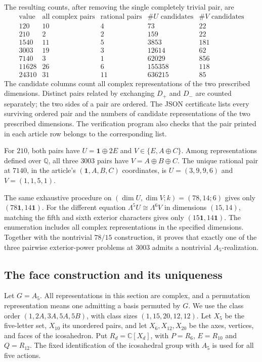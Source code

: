 \documentclass[11pt,a4paper]{article}
\begin{document}
The resulting counts, after removing the single completely trivial pair, are
\[
\begin{array}{r|rr|rr}
\text{value}&\text{all complex pairs}&\text{rational pairs}&\#U\text{ candidates}&\#V\text{ candidates}\\\hline
120&10&4&73&22\\
210&2&2&159&22\\
1540&11&5&3853&181\\
3003&19&3&12614&62\\
7140&3&1&62029&856\\
11628&26&6&155358&118\\
24310&31&11&636215&85
\end{array}
\]
The candidate columns count all complex representations of the two prescribed dimensions. Distinct pairs related by exchanging $D_+$ and $D_-$ are counted separately; the two sides of a pair are ordered. The JSON certificate lists every surviving ordered pair and the numbers of candidate representations of the two prescribed dimensions. The verification program also checks that the pair printed in each article row belongs to the corresponding list.

For $210$, both pairs have $U=\mathbf1\oplus2E$ and $V\in\{E,A\oplus C\}$. Among representations defined over $\mathbb Q$, all three $3003$ pairs have $V=A\oplus B\oplus C$. The unique rational pair at $7140$, in the article's $(\mathbf1,A,B,C)$ coordinates, is $U=(3,9,9,6)$ and $V=(1,1,5,1)$.

The same exhaustive procedure on $(\dim U,\dim V;k)=(78,14;6)$ gives only $(78\mathbf1,14\mathbf1)$. For the different equation $\Lambda^5U\cong\Lambda^6V$ in dimensions $(15,14)$, matching the fifth and sixth exterior characters gives only $(15\mathbf1,14\mathbf1)$. The enumeration includes all complex representations in the specified dimensions. Together with the nontrivial $78/15$ construction, it proves that exactly one of the three pairwise exterior-power problems at $3003$ admits a nontrivial $A_5$-realization.

\subsection{The face construction and its uniqueness}\label{subsec:A5}

Let $G=A_5$. All representations in this section are complex, and a
permutation representation means one admitting a basis permuted by $G$.
We use the class order $(1,2A,3A,5A,5B)$, with class sizes
$(1,15,20,12,12)$. Let $X_5$ be the five-letter set, $X_{10}$ its unordered
pairs, and let $X_6,X_{12},X_{20}$ be the axes, vertices, and faces of the
icosahedron. Put $R_d=\mathbb C[X_d]$, with $P=R_6$, $E=R_{10}$ and
$Q=R_{12}$. The fixed identification of the icosahedral group with $A_5$
is used for all five actions.
\end{document}
